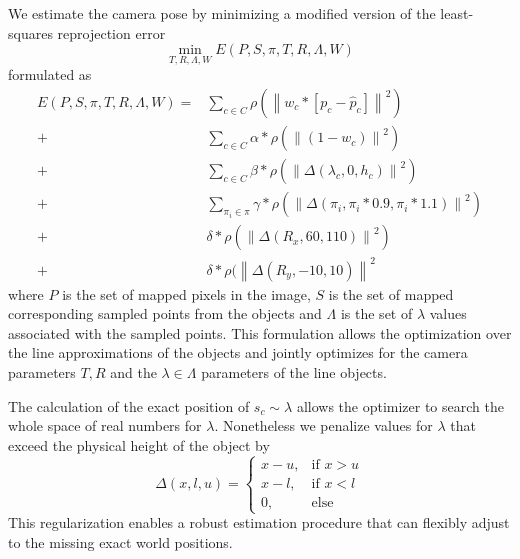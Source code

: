 We estimate the camera pose by minimizing a modified version of the least-squares reprojection error 
\begin{equation}
  \label{eq:static_calibration_error}
  \min_{T, R, \Lambda, W} E(P, S, \pi, T, R, \Lambda, W) 
\end{equation}
formulated as
\begin{equation}
  \begin{split}
  E(P, S, \pi, T, R, \Lambda, W ) =& 
  \sum_{c \in C} 
  \rho(\left\lVert 
    w_c * [ p_c - \hat{p}_c ]
  \right\rVert^2) \\ 
  +& 
  \sum_{c \in C} 
  \alpha * 
  \rho(\left\lVert 
  (1 - w_c)
  \right\rVert^2) \\ 
  +& 
  \sum_{c \in C} 
  \beta * 
  \rho(\left\lVert 
  \Delta(\lambda_c, 0, h_c)
  \right\rVert^2) \\ 
  +& 
  \sum_{\pi_i \in \pi} 
  \gamma *
  \rho(\left\lVert 
  \Delta (\pi_i, \pi_i * 0.9, \pi_i * 1.1)
  \right\rVert^2) \\
  +&
  \delta * 
  \rho(\left\lVert 
  \Delta (R_x, 60, 110)
  \right\rVert^2) \\
  +&
  \delta * 
  \rho(\left\lVert 
  \Delta (R_y, -10, 10)
  \right\rVert^2 
\end{split}
\label{eq:reprojection_error}
\end{equation}
where $P$ is the set of mapped pixels in the image, $S$ is the set of mapped corresponding sampled points from the objects and $\Lambda$ is the set of $\lambda$ values associated with the sampled points.
This formulation allows the optimization over the line approximations of the objects and jointly optimizes for the camera parameters $T, R$ and the $\lambda \in \Lambda$ parameters of the line objects.

The calculation of the exact position of $s_c \sim \lambda$ allows the optimizer to search the whole space of real numbers for $\lambda$.
Nonetheless we penalize values for $\lambda$ that exceed the physical height of the object by 
\begin{equation}
    \Delta (x, l, u) =
    \begin{cases}
      x - u,& \text{if } x > u\\
      x - l,& \text{if } x < l\\
      0,    & \text{else}
    \end{cases} 
\end{equation}
This regularization enables a robust estimation procedure that can flexibly adjust to the missing exact world positions.


